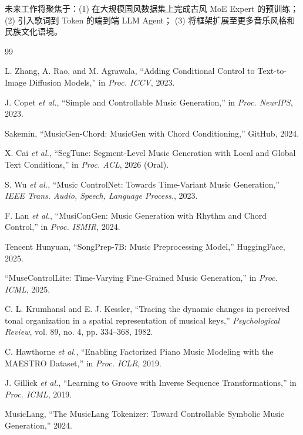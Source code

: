 \documentclass[12pt,a4paper]{article}
\begin{document}
未来工作将聚焦于：(1) 在大规模国风数据集上完成古风 MoE Expert 的预训练；
(2) 引入歌词到 Token 的端到端 LLM Agent；
(3) 将框架扩展至更多音乐风格和民族文化语境。

\begin{thebibliography}{99}

L. Zhang, A. Rao, and M. Agrawala, ``Adding Conditional Control to Text-to-Image Diffusion Models,'' in \textit{Proc. ICCV}, 2023.

J. Copet \textit{et al.}, ``Simple and Controllable Music Generation,'' in \textit{Proc. NeurIPS}, 2023.

Sakemin, ``MusicGen-Chord: MusicGen with Chord Conditioning,'' GitHub, 2024.

X. Cai \textit{et al.}, ``SegTune: Segment-Level Music Generation with Local and Global Text Conditions,'' in \textit{Proc. ACL}, 2026 (Oral).

S. Wu \textit{et al.}, ``Music ControlNet: Towards Time-Variant Music Generation,'' \textit{IEEE Trans. Audio, Speech, Language Process.}, 2023.

F. Lan \textit{et al.}, ``MusiConGen: Music Generation with Rhythm and Chord Control,'' in \textit{Proc. ISMIR}, 2024.

Tencent Hunyuan, ``SongPrep-7B: Music Preprocessing Model,'' HuggingFace, 2025.

``MuseControlLite: Time-Varying Fine-Grained Music Generation,'' in \textit{Proc. ICML}, 2025.

C. L. Krumhansl and E. J. Kessler, ``Tracing the dynamic changes in perceived tonal organization in a spatial representation of musical keys,'' \textit{Psychological Review}, vol. 89, no. 4, pp. 334--368, 1982.

C. Hawthorne \textit{et al.}, ``Enabling Factorized Piano Music Modeling with the MAESTRO Dataset,'' in \textit{Proc. ICLR}, 2019.

J. Gillick \textit{et al.}, ``Learning to Groove with Inverse Sequence Transformations,'' in \textit{Proc. ICML}, 2019.

MusicLang, ``The MusicLang Tokenizer: Toward Controllable Symbolic Music Generation,'' 2024.


\end{thebibliography}
\end{document}
